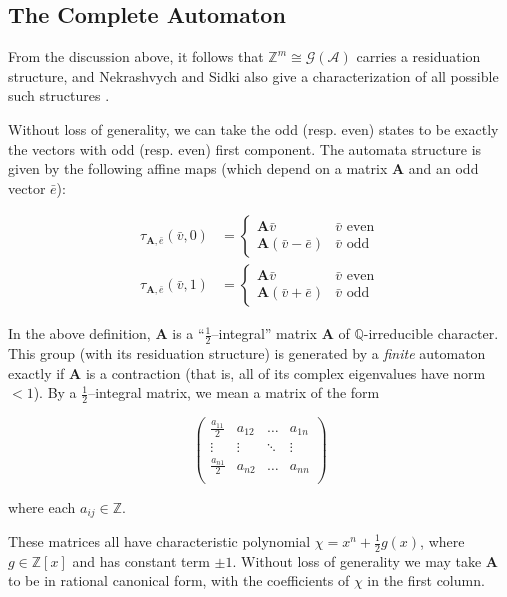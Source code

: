\documentclass[runningheads]{llncs}
\newcommand{\A}{\mathcal{A}}
\newcommand{\G}{\mathcal{G}}
\newcommand{\Z}{\mathbb{Z}}
\newcommand{\Q}{\mathbb{Q}}
\newcommand{\2}{\textbf{2}}
\newcommand{\Am}{\textbf{A}}
\newcommand{\vv}{\bar{v}}
\newcommand{\e}{\bar{e}}
\begin{document}
\subsection{The Complete Automaton}

From the discussion above, it follows that $\Z^m \cong \G(\A)$ carries a
residuation structure, and Nekrashvych and Sidki also give a characterization 
of all possible such structures \cite{NekrashevychSidki04:automorphisms}.

Without loss of generality, we can take the odd (resp. even) states to be 
exactly the vectors with odd (resp. even) first component. The automata 
structure is given by the following affine maps
(which depend on a matrix $\Am$ and an odd vector $\e$):

\begin{align}
  \tau_{\Am, \e}(\vv, 0) &= 
  \begin{cases} 
    \Am \vv        & \vv \text{ even}\\
    \Am (\vv - \e) & \vv \text{ odd}
  \end{cases}
  \label{eq:1}\\
  \tau_{\Am, \e}(\vv, 1) &=
  \begin{cases} 
    \Am \vv        & \vv \text{ even}\\
    \Am (\vv + \e) & \vv \text{ odd}
  \end{cases}
  \label{eq:2}
\end{align}

In the above definition, $\Am$ is a ``$\frac{1}{2}$--integral'' matrix $\Am$ of 
$\Q$-irreducible character. This group (with its residuation structure) is 
generated by a \emph{finite} automaton exactly if $\Am$ is a contraction 
(that is, all of its complex eigenvalues have norm $<1$). By a 
$\frac{1}{2}$--integral matrix, we mean a matrix of the form

\[
\begin{pmatrix}
  \frac{a_{11}}{2} & a_{12} & \dots  & a_{1n}\\
  \vdots           & \vdots & \ddots & \vdots\\
  \frac{a_{n1}}{2} & a_{n2} & \dots  & a_{nn}\\
\end{pmatrix}
\]

\noindent
where each $a_{ij} \in \Z$. 

These matrices all have characteristic polynomial
$\chi = x^n + \frac{1}{2}g(x)$, where $g \in \Z[x]$ and has constant term 
$\pm 1$. Without loss of generality we may take $\Am$ to be in rational 
canonical form, with the coefficients of $\chi$ in the first column.
\end{document}
